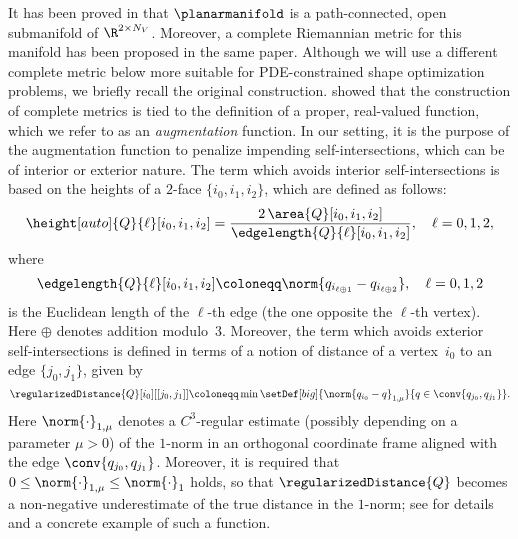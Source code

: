 It has been proved in \cite[Theoremm~3.11]{HerzogLoayzaRomero:2022:1} that $\planarmanifold$ is a path-connected, open submanifold of $\R^{2 \times N_V}$.
Moreover, a complete Riemannian metric for this manifold has been proposed in the same paper.
Although we will use a different complete metric below more suitable for PDE-constrained shape optimization problems, we briefly recall the original construction.
\cite{Gordon:1973:1} showed that the construction of complete metrics is tied to the definition of a proper, real-valued function, which we refer to as an \emph{augmentation} function.
In our setting, it is the purpose of the augmentation function to penalize impending self-intersections, which can be of interior or exterior nature.
The term which avoids interior self-intersections is based on the heights of a $2$-face $\{i_0,i_1,i_2\}$, which are defined as follows:
\begin{equation}
	\label{eq:triangle_height}
	\height[auto]{Q}{\ell}[i_0,i_1,i_2]
	=
	\frac{2 \, \area{Q}[i_0,i_1,i_2]}{\edgelength{Q}{\ell}[i_0,i_1,i_2]}
	,
	\quad
	\ell = 0, 1, 2
	,
\end{equation}
where
\begin{equation}
	\label{eq:edge_length}
	\edgelength{Q}{\ell}[i_0,i_1,i_2]
	\coloneqq
	\norm{q_{i_{\ell \oplus 1}} - q_{i_{\ell \oplus 2}}}
	,
	\quad
	\ell = 0, 1, 2
\end{equation}
is the Euclidean length of the $\ell$-th edge (the one opposite the $\ell$-th vertex).
Here $\oplus$ denotes addition modulo~$3$.
Moreover, the term which avoids exterior self-intersections is defined in terms of a notion of distance of a vertex~$i_0$ to an edge $\{j_0,j_1\}$, given by
\begin{equation}
	\label{eq:regularized_distance_vertex_edge}
	\regularizedDistance{Q}[i_0][[j_0,j_1]]
	\coloneqq
	\min\setDef[big]{\norm{q_{i_0} - q}_{1,\mu}}{q \in \conv\{q_{j_0}, q_{j_1}\}}
	.
\end{equation}
Here $\norm{\cdot}_{1,\mu}$ denotes a $C^3$-regular estimate (possibly depending on a parameter $\mu > 0$) of the $1$-norm in an orthogonal coordinate frame aligned with the edge $\conv\{q_{j_0}, q_{j_1}\}$.
Moreover, it is required that $0 \le \norm{\cdot}_{1,\mu} \le \norm{\cdot}_1$ holds, so that $\regularizedDistance{Q}$ becomes a non-negative underestimate of the true distance in the $1$-norm; see \cite[Section~4 and Appendix~D]{HerzogLoayzaRomero:2022:1} for details and a concrete example of such a function.

